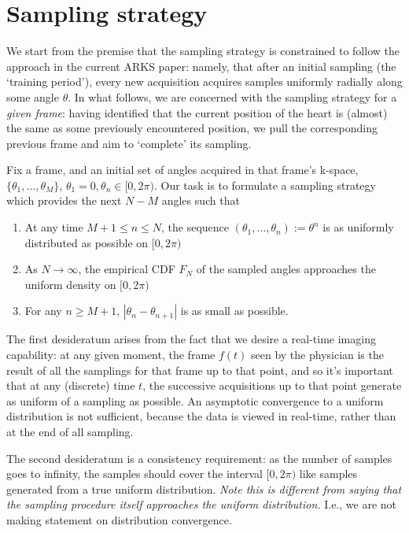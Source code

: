 \section{Sampling strategy}
\label{sec:samplingStrategy}

We start from the premise that the sampling strategy is constrained to follow the approach in the current ARKS paper: namely, that after an initial sampling (the `training period'), every new acquisition acquires samples uniformly radially along some angle $\theta$. 
In what follows, we are concerned with the sampling strategy for a \emph{given frame}: having identified that the current position of the heart is (almost) the same as some previously encountered position, we pull the corresponding previous frame and aim to `complete' its sampling.

Fix a frame, and an initial set of angles acquired in that frame's k-space, $\{\theta_1,\ldots,\theta_M\}$, $\theta_1 = 0, \theta_n \in [0,2\pi)$.
Our task is to formulate a sampling strategy which provides the next $N - M$ angles such that 
\begin{enumerate}
	\item At any time $ M+1 \leq n \leq N$, the sequence $(\theta_1,\ldots , \theta_n):= \theta^n$ is as uniformly distributed as possible on $[0,2\pi)$
	\label{finiteuniform}
	\item As $N \rightarrow \infty$, the empirical CDF $F_N$ of the sampled angles approaches the uniform density on $[0,2\pi)$
	\label{asymptoticuniform}	
	\item For any $n \geq M+1$, $|\theta_n - \theta_{n+1}|$ is as small as possible.
	\label{mineddy}
\end{enumerate}
The first desideratum arises from the fact that we desire a real-time imaging capability: at any given moment, the frame $f(t)$ seen by the physician is the result of all the samplings for that frame up to that point, and so it's important that at any (discrete) time $t$, the successive acquisitions up to that point generate as uniform of a sampling as possible.
An asymptotic convergence to a uniform distribution is not sufficient, because the data is viewed in real-time, rather than at the end of all sampling.

The second desideratum is a consistency requirement: as the number of samples goes to infinity, the samples should cover the interval $[0,2\pi)$ like samples generated from a true uniform distribution. 
\emph{Note this is different from saying that the sampling procedure itself approaches the uniform distribution.}
I.e., we are not making statement on distribution convergence.

